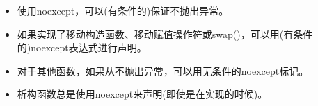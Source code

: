 \begin{itemize}
	\item 使用noexcept，可以(有条件的)保证不抛出异常。
	\item 如果实现了移动构造函数、移动赋值操作符或swap()，可以用(有条件的)noexcept表达式进行声明。
	\item 对于其他函数，如果从不抛出异常，可以用无条件的noexcept标记。
	\item 析构函数总是使用noexcept来声明(即使是在实现的时候)。
\end{itemize}


\newpage